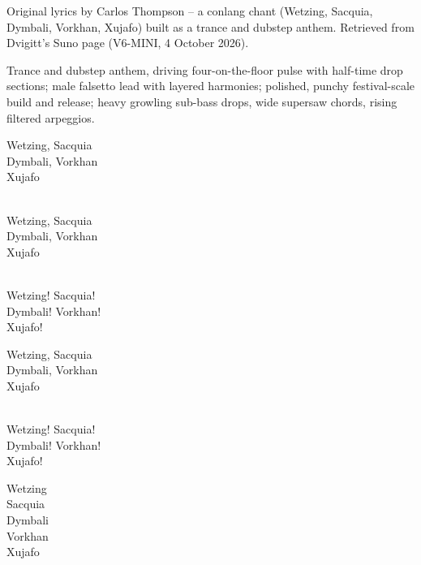 
\begin{notes}
Original lyrics by Carlos Thompson -- a conlang chant (Wetzing, Sacquia, Dymbali, Vorkhan, Xujafo) built as a trance and dubstep anthem. Retrieved from Dvigitt's Suno page (V6-MINI, 4 October 2026).
\end{notes}
\begin{style}
Trance and dubstep anthem, driving four-on-the-floor pulse with half-time drop sections; male falsetto lead with layered harmonies; polished, punchy festival-scale build and release; heavy growling sub-bass drops, wide supersaw chords, rising filtered arpeggios.
\end{style}
\begin{lyrics}
Wetzing, Sacquia\\
Dymbali, Vorkhan\\
Xujafo

\\
Wetzing, Sacquia\\
Dymbali, Vorkhan\\
Xujafo

\\
Wetzing! Sacquia!\\
Dymbali! Vorkhan!\\
Xujafo!

Wetzing, Sacquia\\
Dymbali, Vorkhan\\
Xujafo

\\
Wetzing! Sacquia!\\
Dymbali! Vorkhan!\\
Xujafo!

Wetzing\\
Sacquia\\
Dymbali\\
Vorkhan\\
Xujafo
\end{lyrics}

